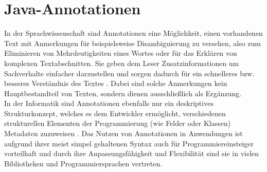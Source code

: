 \section{Java-Annotationen}
\label{java_annotationen}
\noindent In der Sprachwissenschaft sind Annotationen eine Möglichkeit, einen vorhandenen Text mit Anmerkungen für beispielsweise Disambiguierung zu versehen, also zum Eliminieren von Mehrdeutigkeiten eines Wortes oder für das Erklären von komplexen Textabschnitten. Sie geben dem Leser Zusatzinformationen um Sachverhalte einfacher darzustellen und sorgen dadurch für ein schnelleres bzw. besseres Verständnis des Textes \cite{Lemnitzer2015}. Dabei sind solche Anmerkungen kein Hauptbestandteil von Texten, sondern dienen ausschließlich als Ergänzung.\\
In der Informatik sind Annotationen ebenfalls nur ein deskriptives Strukturkonzept, welches es dem Entwickler ermöglicht, verschiedenen strukturellen Elementen der Programmierung (wie Felder oder Klassen) Metadaten zuzuweisen \cite{Yu2019}. Das Nutzen von Annotationen in Anwendungen ist aufgrund ihrer meist simpel gehaltenen Syntax auch für Programmiereinsteiger vorteilhaft und durch ihre Anpassungsfähigkeit und Flexibilität sind sie in vielen Bibliotheken und Programmiersprachen vertreten.
